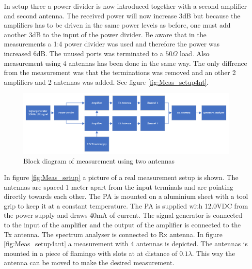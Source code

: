 In setup three a power-divider is now introduced together with a second amplifier and second antenna. The received power will now increase 3dB but because the amplifiers has to be driven in the same power levels as before, one must add another 3dB to the input of the power divider. Be aware that in the measurements a 1:4 power divider was used and therefore the power was increased 6dB. The unused ports was terminated to a $50\Omega$ load. Also measurement using 4 antennas has been done in the same way. The only diffrence from the measurement was that the terminations was removed and an other 2 amplifiers and 2 antennas was added. See figure \ref{fig:Meas_setup4nt}.

\begin{figure}[H]
\centering 
\includegraphics[scale = 0.6]{figures/measurement/meas_set_3.png}
\caption{Block diagram of measurement using two antennas}
\label{fig:Meas_setup3}
\end{figure} 


In figure \ref{fig:Meas_setup} a picture of a real measurement setup is shown. The antennas are spaced 1 meter apart from the input terminals and are pointing directly towards each other. The PA is mounted on a aluminium sheet with a tool grip to keep it at a constant temperature. The PA is supplied with 12.0VDC from the power supply and draws 40mA of current. The signal generator is connected to the input of the amplifier and the output of the amplifier is connected to the Tx antenna. The spectrum analyser is connected to Rx antenna. In figure \ref{fig:Meas_setup4ant} a measurement with 4 antennas is depicted. The antennas is mounted in a piece of flamingo with slots at at distance of $0.1\lambda$. This way the antenna can be moved to make the desired measurement.   


